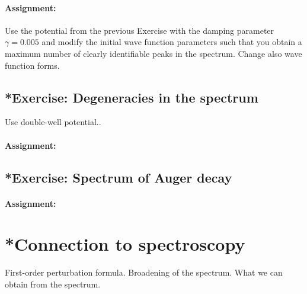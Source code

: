 \paragraph{Assignment:} Use the potential from the previous Exercise with the damping parameter $\gamma = 0.005$ and modify the initial wave function parameters such that you obtain a maximum number of clearly identifiable peaks in the spectrum. Change also wave function forms.



\subsection*{*Exercise: Degeneracies in the spectrum}

Use double-well potential..


\paragraph{Assignment:} 


\subsection*{*Exercise: Spectrum of Auger decay}


\paragraph{Assignment:} 




\section{*Connection to spectroscopy}

First-order perturbation formula. Broadening of the spectrum. What we can obtain from the spectrum.